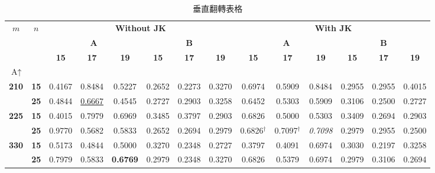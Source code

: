 \begin{sidewaystable}[!htb]
    \centering
    \caption{垂直翻轉表格}
    \label{tab:LPer}
    \begin{tabular}{*{14}{c}}
        \toprule
        \multirow{3}{*}{$m$} & \multirow{3}{*}{$n$} & \multicolumn{6}{c}{\textbf{Without JK}} & \multicolumn{6}{c}{\textbf{With JK}} \\
        \cmidrule(lr){3-8} \cmidrule(lr){9-14}
        & & \multicolumn{3}{c}{\textbf{A}} & \multicolumn{3}{c}{\textbf{B}} & \multicolumn{3}{c}{\textbf{A}} & \multicolumn{3}{c}{\textbf{B}} \\
        \cmidrule(lr){3-5} \cmidrule(lr){6-8} \cmidrule(lr){9-11} \cmidrule(lr){12-14}
        & & \textbf{15} & \textbf{17} & \textbf{19} & \textbf{15} & \textbf{17} & \textbf{19} & \textbf{15} & \textbf{17} & \textbf{19} & \textbf{15} & \textbf{17} & \textbf{19} \\

        \midrule
        \multicolumn{14}{l}{\textbf{$\text{A}\uparrow$}} \\
        \midrule
        \multirow{2}{*}{\textbf{210}} & \textbf{15} & 0.4167 & 0.8484 & 0.5227 & 0.2652 & 0.2273 & 0.3270 & 0.6974 & 0.5909 & 0.8484 & 0.2955 & 0.2955 & 0.4015 \\
                                        & \textbf{25} & 0.4844 & \underline{0.6667} & 0.4545 & 0.2727 & 0.2903 & 0.3258 & 0.6452 & 0.5303 & 0.5909 & 0.3106 & 0.2500 & 0.2727 \\
        \multirow{2}{*}{\textbf{225}} & \textbf{15} & 0.4015 & 0.7979 & 0.6969 & 0.3485 & 0.3797 & 0.2903 & 0.6826 & 0.5000 & 0.5303 & 0.3409 & 0.2694 & 0.2903 \\
                                        & \textbf{25} & 0.9770 & 0.5682 & 0.5833 & 0.2652 & 0.2694 & 0.2979 & 0.6826$^\dagger$ & 0.7097$^\dagger$ & \textit{0.7098} & 0.2979 & 0.2955 & 0.2500 \\
        \multirow{2}{*}{\textbf{330}} & \textbf{15} & 0.5173 & 0.4844 & 0.5000 & 0.3270 & 0.2348 & 0.2727 & 0.3797 & 0.4091 & 0.6974 & 0.3030 & 0.2197 & 0.3258 \\
                                        & \textbf{25} & 0.7979 & 0.5833 & \textbf{0.6769} & 0.2979 & 0.2348 & 0.3270 & 0.6826 & 0.5379 & 0.6974 & 0.2979 & 0.3106 & 0.2694 \\


\end{tabular}
\end{sidewaystable}

